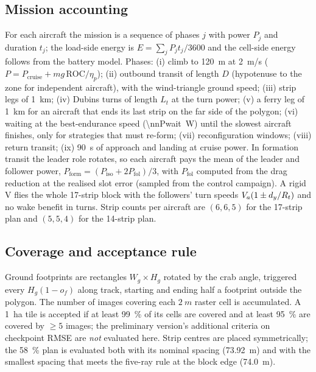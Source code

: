 \subsection{Mission accounting}\label{sec:accounting}
For each aircraft the mission is a sequence of phases $j$ with power $P_j$ and duration $t_j$; the load-side energy is $E=\sum_jP_jt_j/3600$ and the cell-side energy follows from the battery model. Phases: (i) climb to \SI{120}{m} at \SI{2}{m/s} ($P=P_{\mathrm{cruise}}+mg\,\mathrm{ROC}/\eta_p$); (ii) outbound transit of length $D$ (hypotenuse to the zone for independent aircraft), with the wind-triangle ground speed; (iii) strip legs of \SI{1}{km}; (iv) Dubins turns of length $L_t$ at the turn power; (v) a ferry leg of \SI{1}{km} for an aircraft that ends its last strip on the far side of the polygon; (vi) waiting at the best-endurance speed (\SI{\nnPwait}{W}) until the slowest aircraft finishes, only for strategies that must re-form; (vii) reconfiguration windows; (viii) return transit; (ix) \SI{90}{s} of approach and landing at cruise power. In formation transit the leader role rotates, so each aircraft pays the mean of the leader and follower power, $P_{\mathrm{form}}=(P_{\mathrm{iso}}+2P_{\mathrm{fol}})/3$, with $P_{\mathrm{fol}}$ computed from the drag reduction at the realised slot error (sampled from the control campaign). A rigid V flies the whole 17-strip block with the followers' turn speeds $V_a(1\pm d_y/R_t)$ and no wake benefit in turns. Strip counts per aircraft are $(6,6,5)$ for the 17-strip plan and $(5,5,4)$ for the 14-strip plan.

\subsection{Coverage and acceptance rule}\label{sec:acceptance}
Ground footprints are rectangles $W_g\times H_g$ rotated by the crab angle, triggered every $H_g(1-o_f)$ along track, starting and ending half a footprint outside the polygon. The number of images covering each $\SI{2}{m}$ raster cell is accumulated. A \SI{1}{ha} tile is accepted if at least \SI{99}{\percent} of its cells are covered and at least \SI{95}{\percent} are covered by $\ge5$ images; the preliminary version's additional criteria on checkpoint RMSE \cite{asprs2024} are \emph{not} evaluated here. Strip centres are placed symmetrically; the \SI{58}{\percent} plan is evaluated both with its nominal spacing (\SI{73.92}{m}) and with the smallest spacing that meets the five-ray rule at the block edge (\SI{74.0}{m}).
